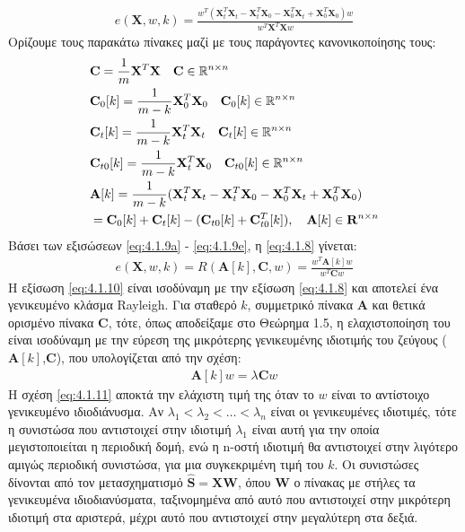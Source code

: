 \begin{align} \label{eq:4.1.8}
    e(\mathbf{X},w,k) = \frac{w^T(\mathbf{X}_t^T\mathbf{X}_t - \mathbf{X}_t^T\mathbf{X}_0 - \mathbf{X}_0^T\mathbf{X}_t + \mathbf{X}_0^T\mathbf{X}_0)w} {w^T \mathbf{X}^T \mathbf{X} w}
\end{align}
Ορίζουμε τους παρακάτω πίνακες μαζί με τους παράγοντες κανονικοποίησης τους:
\begin{subequations}
\begin{align} 
&\mathbf{C} = \frac{1}{m} \mathbf{X}^T \mathbf{X} \quad \mathbf{C} \in \mathbb{R}^{n \times n} \\ \label{eq:4.1.9a}
&\mathbf{C}_0[k] = \frac{1}{m-k} \mathbf{X}_0^T \mathbf{X}_0 \quad \mathbf{C}_0[k] \in \mathbb{R}^{n\times n} \\ \label{eq:4.1.9b}
&\mathbf{C}_t[k] = \frac{1}{m-k} \mathbf{X}_t^T \mathbf{X}_t \quad \mathbf{C}_t[k] \in \mathbb{R}^{n\times n} \\\label{eq:4.1.9c}
&\mathbf{C}_{t0}[k] = \frac{1}{m-k} \mathbf{X}_t^T \mathbf{X}_0 \quad \mathbf{C}_{t0}[k] \in \mathbb{R}^{n\times n} \\ \label{eq:4.1.9d}
&\mathbf{A}[k] = \frac{1}{m-k}( \mathbf{X}_t^T \mathbf{X}_t - \mathbf{X}_t^T \mathbf{X}_0 - \mathbf{X}_0^T \mathbf{X}_t 
+ \mathbf{X}_0^T \mathbf{X}_0) \notag \\
& = \mathbf{C}_0[k] + \mathbf{C}_t[k] - ( \mathbf{C}_{t0}[k]+ \mathbf{C}_{t0}^T[k] ) , \quad \mathbf{A}[k] \in \mathbf{R}^{n \times n}
\end{align} \label{eq:4.1.9e} 
\end{subequations}
Βάσει των εξισώσεων \eqref{eq:4.1.9a} - \eqref{eq:4.1.9e}, η \eqref{eq:4.1.8} γίνεται:
\begin{align} \label{eq:4.1.10}
    e(\mathbf{X},w,k) = R(\mathbf{A}[k],\mathbf{C},w) = 
    \frac{w^T\mathbf{A}[k]w} {w^T \mathbf{C} w}
\end{align}
Η εξίσωση \eqref{eq:4.1.10} είναι ισοδύναμη με την εξίσωση \eqref{eq:4.1.8} και αποτελεί ένα γενικευμένο κλάσμα Rayleigh. Για σταθερό $k$, συμμετρικό πίνακα $\mathbf{A}$ και θετικά ορισμένο πίνακα $\mathbf{C}$, τότε, όπως αποδείξαμε στο Θεώρημα 1.5, η ελαχιστοποίηση του είναι ισοδύναμη με την εύρεση της μικρότερης γενικευμένης ιδιοτιμής του ζεύγους ($\mathbf{A}[k]$,$\mathbf{C}$), που υπολογίζεται από την σχέση:
\begin{align} \label{eq:4.1.11}
    \mathbf{A}[k]w = \lambda \mathbf{C} w
\end{align}
\newpage 
\noindent Η σχέση \eqref{eq:4.1.11} αποκτά την ελάχιστη τιμή της όταν το $w$ είναι το αντίστοιχο γενικευμένο ιδιοδιάνυσμα. Αν $\lambda _1 < \lambda _2 < \ldots < \lambda_n$ είναι οι γενικευμένες ιδιοτιμές, τότε η συνιστώσα που αντιστοιχεί στην ιδιοτιμή $\lambda_1$ είναι αυτή για την οποία μεγιστοποιείται η περιοδική δομή, ενώ η n-οστή ιδιοτιμή θα αντιστοιχεί στην λιγότερο αμιγώς περιοδική συνιστώσα, για μια συγκεκριμένη τιμή του $k$. Οι συνιστώσες δίνονται από τον μετασχηματισμό $\mathbf{\hat{S}} = \mathbf{X}\mathbf{W} $, όπου $\mathbf{W}$ ο πίνακας με στήλες τα γενικευμένα ιδιοδιανύσματα, ταξινομημένα από αυτό που αντιστοιχεί στην μικρότερη ιδιοτιμή στα αριστερά, μέχρι αυτό που αντιστοιχεί στην μεγαλύτερη στα δεξιά.
